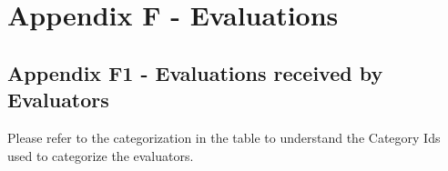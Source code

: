 \chapter{Appendix F - Evaluations}
\label{appendix:evaluation}

\section*{Appendix F1 - Evaluations received by Evaluators}

Please refer to the categorization in the table \textit{\textbf{}} to understand the Category Ids used to categorize the evaluators.

\vspace{-4mm}
